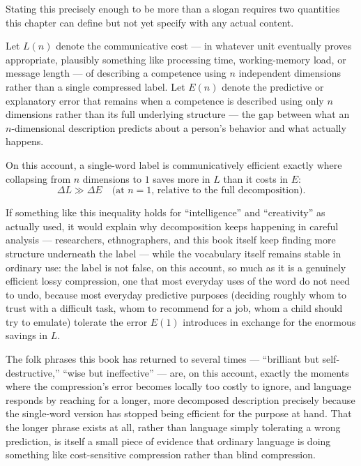 Stating this precisely enough to be more than a slogan requires two quantities this chapter can define but not yet specify with any actual content.

\begin{definition}
Let $L(n)$ denote the communicative cost --- in whatever unit eventually proves appropriate, plausibly something like processing time, working-memory load, or message length --- of describing a competence using $n$ independent dimensions rather than a single compressed label. Let $E(n)$ denote the predictive or explanatory error that remains when a competence is described using only $n$ dimensions rather than its full underlying structure --- the gap between what an $n$-dimensional description predicts about a person's behavior and what actually happens.
\end{definition}

On this account, a single-word label is communicatively efficient exactly where collapsing from $n$ dimensions to $1$ saves more in $L$ than it costs in $E$:
\[
\Delta L \gg \Delta E \quad \text{(at } n=1\text{, relative to the full decomposition)}.
\]

If something like this inequality holds for ``intelligence'' and ``creativity'' as actually used, it would explain why decomposition keeps happening in careful analysis --- researchers, ethnographers, and this book itself keep finding more structure underneath the label --- while the vocabulary itself remains stable in ordinary use: the label is not false, on this account, so much as it is a genuinely efficient lossy compression, one that most everyday uses of the word do not need to undo, because most everyday predictive purposes (deciding roughly whom to trust with a difficult task, whom to recommend for a job, whom a child should try to emulate) tolerate the error $E(1)$ introduces in exchange for the enormous savings in $L$.

The folk phrases this book has returned to several times --- ``brilliant but self-destructive,'' ``wise but ineffective'' --- are, on this account, exactly the moments where the compression's error becomes locally too costly to ignore, and language responds by reaching for a longer, more decomposed description precisely because the single-word version has stopped being efficient for the purpose at hand. That the longer phrase exists at all, rather than language simply tolerating a wrong prediction, is itself a small piece of evidence that ordinary language is doing something like cost-sensitive compression rather than blind compression.

